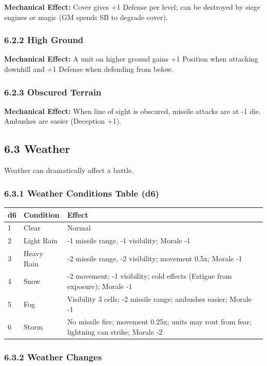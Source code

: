 \documentclass[11pt]{article}
\begin{document}
\textbf{Mechanical Effect:} Cover gives +1 Defense per level; can be destroyed by siege engines or magic (GM spends SB to degrade cover).

\subsubsection{6.2.2 High Ground}

\textbf{Mechanical Effect:} A unit on higher ground gains +1 Position when attacking downhill and +1 Defense when defending from below.

\subsubsection{6.2.3 Obscured Terrain}

\textbf{Mechanical Effect:} When line of sight is obscured, missile attacks are at -1 die. Ambushes are easier (Deception +1).

\subsection{6.3 Weather}

Weather can dramatically affect a battle.

\subsubsection{6.3.1 Weather Conditions Table (d6)}

\begin{tabular}{|l|l|l|}
\hline
d6 & Condition & Effect \\
\hline
1 & Clear & Normal \\
\hline
2 & Light Rain & -1 missile range, -1 visibility; Morale -1 \\
\hline
3 & Heavy Rain & -2 missile range, -2 visibility; movement 0.5x; Morale -1 \\
\hline
4 & Snow & -2 movement; -1 visibility; cold effects (Fatigue from exposure); Morale -1 \\
\hline
5 & Fog & Visibility 3 cells; -2 missile range; ambushes easier; Morale -1 \\
\hline
6 & Storm & No missile fire; movement 0.25x; units may rout from fear; lightning can strike; Morale -2 \\
\hline
\end{tabular}

\subsubsection{6.3.2 Weather Changes}
\end{document}
